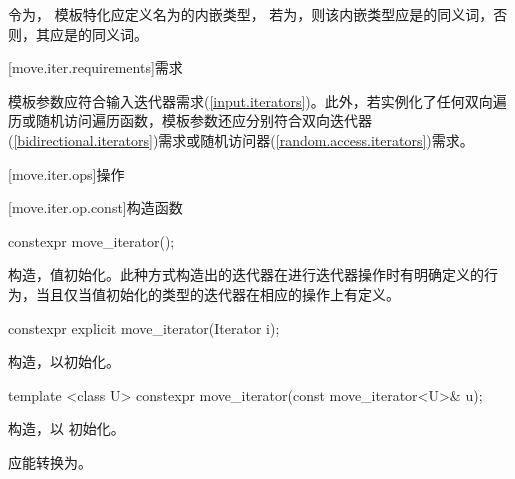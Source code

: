 \pnum
令为，
模板特化应定义名为的内嵌类型，
若为，则该内嵌类型应是的同义词，否则，其应是的同义词。

[move.iter.requirements]{需求}

\pnum
模板参数应符合输入迭代器需求(\ref{input.iterators})。此外，若实例化了任何双向遍历或随机访问遍历函数，模板参数还应分别符合双向迭代器(\ref{bidirectional.iterators})需求或随机访问器(\ref{random.access.iterators})需求。

[move.iter.ops]{操作}

[move.iter.op.const]{构造函数}

%
\begin{itemdecl}
constexpr move_iterator();
\end{itemdecl}

\begin{itemdescr}
\pnum
\effects 构造，值初始化。此种方式构造出的迭代器在进行迭代器操作时有明确定义的行为，当且仅当值初始化的类型的迭代器在相应的操作上有定义。
\end{itemdescr}


%
\begin{itemdecl}
constexpr explicit move_iterator(Iterator i);
\end{itemdecl}

\begin{itemdescr}
\pnum
\effects
构造，以初始化。
\end{itemdescr}


%
\begin{itemdecl}
template <class U> constexpr move_iterator(const move_iterator<U>& u);
\end{itemdecl}

\begin{itemdescr}
\pnum
\effects
构造，以 初始化。

\pnum
\requires {} 应能转换为。
\end{itemdescr}

